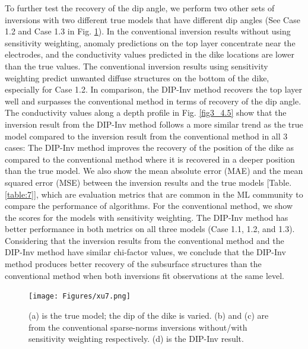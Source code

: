 \documentclass[lettersize,journal]{IEEEtran}
\begin{document}
To further test the recovery of the dip angle, we perform two other sets of inversions with two different true models that have different dip angles (See Case 1.2 and Case 1.3 in Fig. \ref{fig3_4}). In the conventional inversion results without using sensitivity weighting, anomaly predictions on the top layer concentrate near the electrodes, and the conductivity values predicted in the dike locations are lower than the true values. The conventional inversion results using sensitivity weighting predict unwanted diffuse structures on the bottom of the dike, especially for Case 1.2. In comparison, the DIP-Inv method recovers the top layer well and surpasses the conventional method in terms of recovery of the dip angle. The conductivity values along a depth profile in Fig. \ref{fig3_4.5} show that the inversion result from the DIP-Inv method follows a more similar trend as the true model compared to the inversion result from the conventional method in all 3 cases: The DIP-Inv method improves the recovery of the position of the dike as compared to the conventional method where it is recovered in a deeper position than the true model. We also show the mean absolute error (MAE) and the mean squared error (MSE) between the inversion results and the true models [Table. \ref{table:7}], which are evaluation metrics that are common in the ML community to compare the performance of algorithms. For the conventional method, we show the scores for the models with sensitivity weighting. The DIP-Inv method has better performance in both metrics on all three models (Case 1.1, 1.2, and 1.3). Considering that the inversion results from the conventional method and the DIP-Inv method have similar chi-factor values, we conclude that the DIP-Inv method produces better recovery of the subsurface structures than the conventional method when both inversions fit observations at the same level. 

\begin{figure}
\begin{center}
    \centering
    \texttt{[image: Figures/xu7.png]}
    \caption{(a) is the true model; the dip of the dike is varied. (b) and (c) are from the conventional sparse-norms inversions without/with sensitivity weighting respectively. (d) is the DIP-Inv result.}
    \label{fig3_4}
\end{center}
\end{figure}
\end{document}
